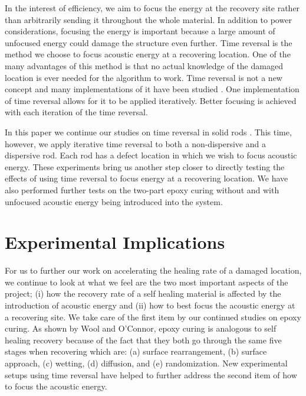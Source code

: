 \documentclass[]{aiaa-tc}%
\begin{document}
In the interest of efficiency, we aim to focus the energy at the recovery site rather than arbitrarily sending it throughout the whole material. In addition to power considerations, focusing the energy is important because a large amount of unfocused energy could damage the structure even further. Time reversal is the method we choose to focus acoustic energy at a recovering location. One of the many advantages of this method is that no actual knowledge of the damaged location is ever needed for the algorithm to work. Time reversal is not a new concept and many implementations of it have been studied \cite{ Anderson2008, Borcea2003, Fink2009, Sutin2004, Harley2009}.  One implementation of time reversal allows for it to be applied iteratively. Better focusing is achieved with each iteration of the time reversal. 

In this paper we continue our studies on time reversal in solid rods \cite{AIAASelfHeal2011}. This time, however, we apply iterative time reversal to both a non-dispersive and a dispersive rod. Each rod has a defect location in which we wish to focus acoustic energy.  These experiments bring us another step closer to directly testing the effects of using time reversal to focus energy at a recovering location. We have also performed further tests on the two-part epoxy curing without and with unfocused acoustic energy being introduced into the system.

\section{Experimental Implications}

For us to further our work on accelerating the healing rate of a damaged location, we continue to look at what we feel are the two most important aspects of the project; (i) how the recovery rate of a self healing material is affected by the introduction of acoustic energy and (ii) how to best focus the acoustic energy at a recovering site. We take care of the first item by our continued studies on epoxy curing. As shown by Wool and O'Connor, epoxy curing is analogous to self healing recovery because of the fact that they both go through the same five stages when recovering which are: (a) surface rearrangement, (b) surface approach, (c) wetting, (d) diffusion, and (e) randomization. New experimental setups using time reversal have helped to further address the second item of how to focus the acoustic energy.
\end{document}
